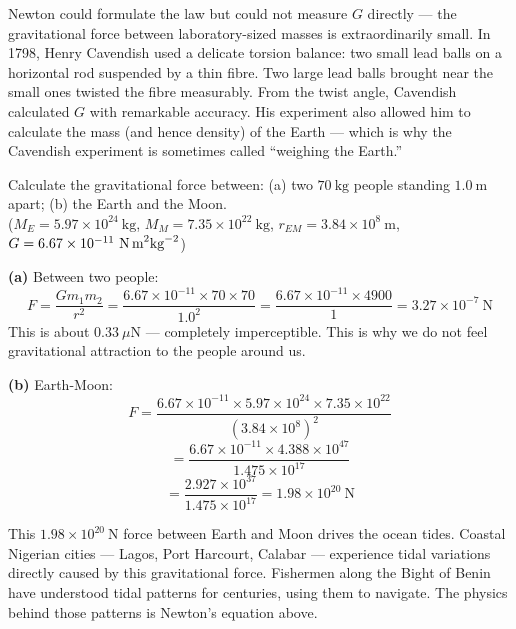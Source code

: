 \begin{historybox}
Newton could formulate the law but could not measure
$G$ directly --- the gravitational force between
laboratory-sized masses is extraordinarily small.
In 1798, Henry Cavendish used a delicate torsion balance:
two small lead balls on a horizontal rod suspended by
a thin fibre. Two large lead balls brought near the
small ones twisted the fibre measurably. From the
twist angle, Cavendish calculated $G$ with remarkable
accuracy. His experiment also allowed him to calculate
the mass (and hence density) of the Earth --- which is
why the Cavendish experiment is sometimes called
``weighing the Earth.''
\end{historybox}

\begin{examplebox}[8.1]
Calculate the gravitational force between:
(a) two $70\ \text{kg}$ people standing $1.0\ \text{m}$
apart;
(b) the Earth and the Moon.\\
($M_E = 5.97\times10^{24}\ \text{kg}$,
$M_M = 7.35\times10^{22}\ \text{kg}$,
$r_{EM} = 3.84\times10^8\ \text{m}$,
$G = 6.67\times10^{-11}\ \text{N\,m}^2\text{kg}^{-2}$)
\end{examplebox}

\begin{solutionbox}
\textbf{(a)} Between two people:
\[
  F = \frac{Gm_1m_2}{r^2}
  = \frac{6.67\times10^{-11} \times 70 \times 70}{1.0^2}
  = \frac{6.67\times10^{-11} \times 4900}{1}
  = 3.27\times10^{-7}\ \text{N}
\]
This is about $0.33\ \mu\text{N}$ --- completely
imperceptible. This is why we do not feel gravitational
attraction to the people around us.

\textbf{(b)} Earth-Moon:
\[
  F = \frac{6.67\times10^{-11}
    \times 5.97\times10^{24}
    \times 7.35\times10^{22}}
    {(3.84\times10^8)^2}
\]
\[
  = \frac{6.67\times10^{-11}
    \times 4.388\times10^{47}}
    {1.475\times10^{17}}
\]
\[
  = \frac{2.927\times10^{37}}{1.475\times10^{17}}
  = 1.98\times10^{20}\ \text{N}
\]

\begin{realworldbox}
This $1.98\times10^{20}\ \text{N}$ force between
Earth and Moon drives the ocean tides. Coastal Nigerian
cities --- Lagos, Port Harcourt, Calabar --- experience
tidal variations directly caused by this gravitational
force. Fishermen along the Bight of Benin have
understood tidal patterns for centuries, using them to
navigate. The physics behind those patterns is
Newton's equation above.
\end{realworldbox}
\end{solutionbox}

